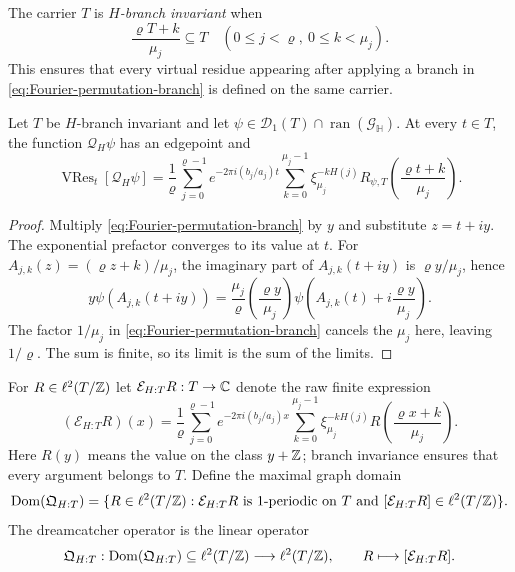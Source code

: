 The carrier $T$ is \emph{$H$-branch invariant} when
\begin{equation}
\label{eq:H-branch-invariant}
 \frac{\varrho T+k}{\mu_j}\subseteq T
 \quad(0\leq j<\varrho,\ 0\leq k<\mu_j).
\end{equation}
This ensures that every virtual residue appearing after applying a branch in
\cref{eq:Fourier-permutation-branch} is defined on the same carrier.

\begin{lemma}
\label{lem:VRF}
Let $T$ be $H$-branch invariant and let
$\psi\in\mathcal D_1(T)\cap\operatorname{ran}(\mathcal G_{\mathbb H})$.
At every $t\in T$, the function $\mathscr Q_H\psi$ has an edgepoint and
\begin{equation}
\label{eq:VRF}
 \operatorname{VRes}_t[\mathscr Q_H\psi]
 =\frac1\varrho\sum_{j=0}^{\varrho-1}
 e^{-2\pi i(b_j/a_j)t}
 \sum_{k=0}^{\mu_j-1}\xi_{\mu_j}^{-kH(j)}
 R_{\psi,T}\left(\frac{\varrho t+k}{\mu_j}\right).
\end{equation}
\end{lemma}

\begin{proof}
Multiply \cref{eq:Fourier-permutation-branch} by $y$ and substitute
$z=t+iy$.  The exponential prefactor converges to its value at $t$.  For
$A_{j,k}(z)=(\varrho z+k)/\mu_j$, the imaginary part of $A_{j,k}(t+iy)$ is
$\varrho y/\mu_j$, hence
\[
 y\psi(A_{j,k}(t+iy))
 =\frac{\mu_j}{\varrho}
   \left(\frac{\varrho y}{\mu_j}\right)
   \psi\left(A_{j,k}(t)+i\frac{\varrho y}{\mu_j}\right).
\]
The factor $1/\mu_j$ in \cref{eq:Fourier-permutation-branch} cancels the
$\mu_j$ here, leaving $1/\varrho$.  The sum is finite, so its limit is the
sum of the limits.
\end{proof}

\begin{definition}
For $R\in\ell^2(T/\mathbb Z)$ let $\mathcal E_{H:T}R:T\to\mathbb C$ denote the raw finite
expression
\begin{equation}
\label{eq:dreamcatcher-operator}
 (\mathcal E_{H:T}R)(x)
 =\frac1\varrho\sum_{j=0}^{\varrho-1}
 e^{-2\pi i(b_j/a_j)x}
 \sum_{k=0}^{\mu_j-1}\xi_{\mu_j}^{-kH(j)}
 R\left(\frac{\varrho x+k}{\mu_j}\right).
\end{equation}
Here $R(y)$ means the value on the class $y+\mathbb Z$; branch invariance ensures
that every argument belongs to $T$.  Define the maximal graph domain
\[
 \operatorname{Dom}(\mathfrak Q_{H:T})
 =\{R\in\ell^2(T/\mathbb Z):
     \mathcal E_{H:T}R\text{ is $1$-periodic on $T$ and }
     [\mathcal E_{H:T}R]\in\ell^2(T/\mathbb Z)\}.
\]
The dreamcatcher operator is the linear operator
\[
 \mathfrak Q_{H:T}:\operatorname{Dom}(\mathfrak Q_{H:T})
 \subseteq\ell^2(T/\mathbb Z)\longrightarrow\ell^2(T/\mathbb Z),
 \qquad R\longmapsto[\mathcal E_{H:T}R].
\]
\end{definition}

